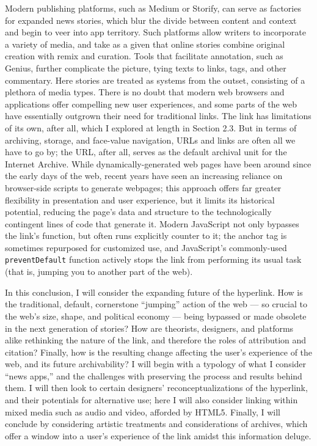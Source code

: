 Modern publishing platforms, such as Medium or Storify, can serve as factories for expanded news stories, which blur the divide between content and context and begin to veer into app territory. Such platforms allow writers to incorporate a variety of media, and take as a given that online stories combine original creation with remix and curation. Tools that facilitate annotation, such as Genius, further complicate the picture, tying texts to links, tags, and other commentary. Here stories are treated as systems from the outset, consisting of a plethora of media types. There is no doubt that modern web browsers and applications offer compelling new user experiences, and some parts of the web have essentially outgrown their need for traditional links. The link has limitations of its own, after all, which I explored at length in Section 2.3. But in terms of archiving, storage, and face-value navigation, URLs and links are often all we have to go by; the URL, after all, serves as the default archival unit for the Internet Archive. While dynamically-generated web pages have been around since the early days of the web, recent years have seen an increasing reliance on browser-side scripts to generate webpages; this approach offers far greater flexibility in presentation and user experience, but it limits its historical potential, reducing the page's data and structure to the technologically contingent lines of code that generate it. Modern JavaScript not only bypasses the link's function, but often runs explicitly counter to it; the anchor tag is sometimes repurposed for customized use, and JavaScript's commonly-used \texttt{preventDefault} function actively stops the link from performing its usual task (that is, jumping you to another part of the web).

In this conclusion, I will consider the expanding future of the hyperlink. How is the traditional, default, cornerstone ``jumping'' action of the web --- so crucial to the web's size, shape, and political economy --- being bypassed or made obsolete in the next generation of stories? How are theorists, designers, and platforms alike rethinking the nature of the link, and therefore the roles of attribution and citation? Finally, how is the resulting change affecting the user's experience of the web, and its future archivability? I will begin with a typology of what I consider ``news apps,'' and the challenges with preserving the process and results behind them. I will then look to certain designers' reconceptualizations of the hyperlink, and their potentials for alternative use; here I will also consider linking within mixed media such as audio and video, afforded by HTML5. Finally, I will conclude by considering artistic treatments and considerations of archives, which offer a window into a user's experience of the link amidst this information deluge.

